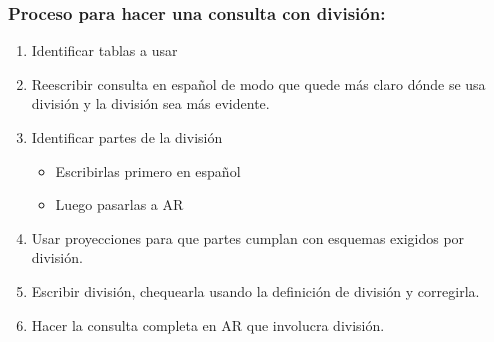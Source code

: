 \documentclass[12pt,a4paper]{report}
\begin{document}
		\subsubsection{Proceso para hacer una consulta con división:}
		\begin{enumerate}
			\item Identificar tablas a usar
			\item Reescribir consulta en español de modo que quede más claro dónde se usa división y la división sea más evidente.
			\item Identificar partes de la división
			\begin{itemize}
				\item Escribirlas primero en español
				\item Luego pasarlas a AR
			\end{itemize}
			\item Usar proyecciones para que partes cumplan con esquemas exigidos por división.
			\item Escribir división, chequearla usando la definición de división y corregirla.
			\item Hacer la consulta completa en AR que involucra división.
		\end{enumerate}
	
\end{document}
